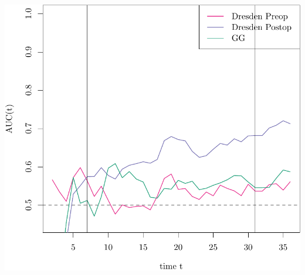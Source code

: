 \documentclass{article}\usepackage[]{graphicx}\usepackage[]{color}
\makeatletter
\def\maxwidth{ %
  \ifdim\Gin@nat@width>\linewidth
    \linewidth
  \else
    \Gin@nat@width
  \fi
}
\newenvironment{knitrout}{}{} %
\makeatother
\begin{document}
\begin{knitrout}
{\centering \includegraphics[width=\maxwidth]{figure/07-timeROC-dresden-1} 

}



\end{knitrout}
\end{document}
